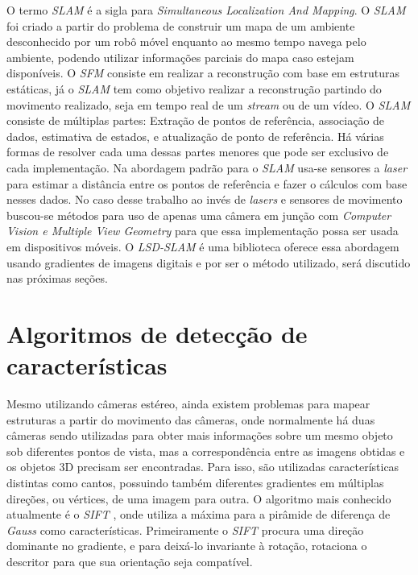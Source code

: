 O termo \textit{SLAM} é a sigla para \textit{Simultaneous Localization And Mapping}. O \textit{SLAM} foi criado a partir do problema de construir um mapa de um ambiente desconhecido por um robô móvel enquanto ao mesmo tempo navega pelo ambiente, podendo utilizar informações parciais do mapa caso estejam disponíveis. O \textit{SFM} consiste em realizar a reconstrução com base em estruturas estáticas, já o \textit{SLAM} tem como objetivo realizar a reconstrução partindo do movimento realizado, seja em tempo real de um \textit{stream} ou de um vídeo. O \textit{SLAM} consiste de múltiplas partes: Extração de pontos de referência, associação de dados, estimativa de estados, e atualização de ponto de referência. Há várias formas de resolver cada uma dessas partes menores que pode ser exclusivo de cada implementação\cite{SLAM-Dummies}. Na abordagem padrão para o \textit{SLAM} usa-se sensores a \textit{laser} para estimar a distância entre os pontos de referência e fazer o cálculos com base nesses dados. No caso desse trabalho ao invés de \textit{lasers} e sensores de movimento buscou-se métodos para uso de apenas uma câmera em junção com \textit{Computer Vision e Multiple View Geometry} para que essa implementação possa ser usada em dispositivos móveis. O \textit{LSD-SLAM} é uma biblioteca oferece essa abordagem usando gradientes de imagens digitais e por ser o método utilizado, será discutido nas próximas seções.



\section{Algoritmos de detecção de características}
  
Mesmo utilizando câmeras estéreo, ainda existem problemas para mapear estruturas a partir do movimento das câmeras, onde normalmente há duas câmeras sendo utilizadas para obter mais informações sobre um mesmo objeto sob diferentes pontos de vista, mas a correspondência entre as imagens obtidas e os objetos 3D precisam ser encontradas. Para isso, são utilizadas características distintas como cantos, possuindo também diferentes gradientes em múltiplas direções, ou vértices, de uma imagem para outra. O algoritmo mais conhecido atualmente é o \textit{SIFT} \cite{SIFT}, onde utiliza a máxima para a pirâmide de diferença de \textit{Gauss} como características. Primeiramente o \textit{SIFT} procura uma direção dominante no gradiente, e para deixá-lo invariante à rotação, rotaciona o descritor para que sua orientação seja compatível.
  

